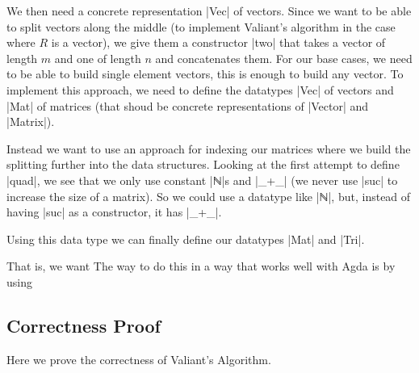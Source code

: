 We then need a concrete representation |Vec| of vectors. Since we want to be able to split vectors along the middle (to implement Valiant's algorithm in the case where $R$ is a vector), we give them a constructor |two| that takes a vector of length $m$ and one of length $n$ and concatenates them. For our base cases, we need to be able to build single element vectors, this is enough to build any vector.
To implement this approach, we need to define the datatypes |Vec| of vectors and |Mat| of matrices (that shoud be concrete representations of |Vector| and |Matrix|).


Instead we want to use an approach for indexing our matrices where we build the splitting further into the data structures. Looking at the first attempt to define |quad|, we see that we only use constant |ℕ|s and |_+_| (we never use |suc| to increase the size of a matrix). So we could use a datatype like |ℕ|, but, instead of having |suc| as a constructor, it has |_+_|.

Using this data type we can finally define our datatypes |Mat| and |Tri|.



That is, we want 
The way to do this in a way that works well with Agda is by using 



\subsection{Correctness Proof}
Here we prove the correctness of Valiant's Algorithm.

